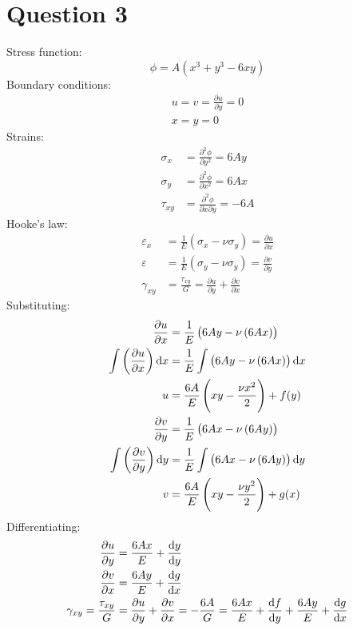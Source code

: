 \section{Question 3}
Stress function:
\begin{equation}
    \phi = A \left(x^3 + y^3 -6xy\right)
\end{equation}
Boundary conditions:
\begin{align}
    u = v = \frac{\partial u}{\partial y} = 0 \\
    x = y = 0
\end{align}
Strains:
\begin{align}
    \sigma_x  & = \frac{\partial^2 \phi}{\partial y^2} = 6Ay          \\
    \sigma_y  & = \frac{\partial^2 \phi}{\partial x^2} = 6Ax          \\
    \tau_{xy} & = \frac{\partial^2 \phi}{\partial x \partial y} = -6A
\end{align}
Hooke's law:
\begin{align}
    \varepsilon_x & = \frac{1}{E}\left(\sigma_x - \nu \sigma_y\right) = \frac{\partial u}{\partial x}     \\
    \varepsilon   & = \frac{1}{E}\left(\sigma_y - \nu \sigma_y\right) = \frac{\partial v}{\partial y}     \\
    \gamma_{xy}   & = \frac{\tau_{xy}}{G} = \frac{\partial u}{\partial y} + \frac{\partial v}{\partial x}
\end{align}
Substituting:
\begin{align}
    \frac{\partial u}{\partial x}                         & = \frac{1}{E}\left(6Ay - \nu \left(6Ax\right)\right)           \\
    \int\left(\frac{\partial u}{\partial x} \right)\dif x & = \frac{1}{E}\int\left(6Ay - \nu \left(6Ax\right)\right)\dif x \\
    u                                                     & = \frac{6A}{E}\left(xy - \frac{\nu x^2}{2}\right) + f(y)       \\
    \frac{\partial v}{\partial y}                         & = \frac{1}{E} \left(6Ax - \nu \left(6Ay\right)\right)          \\
    \int\left(\frac{\partial v}{\partial y}\right)\dif y  & = \frac{1}{E}\int\left(6Ax - \nu\left(6Ay\right)\right)\dif y  \\
    v                                                     & = \frac{6A}{E}\left(xy - \frac{\nu y^2}{2}\right) + g(x)
\end{align}
Differentiating:
\begin{align}
    \frac{\partial u }{\partial y}    & = \frac{6Ax}{E} + \frac{\dif y }{\dif y}                                                                                                                      \\
    \frac{\partial v}{\partial x}     & = \frac{6Ay}{E} + \frac{\dif g}{\dif x}                                                                                                                       \\
    \gamma_{xy} = \frac{\tau_{xy}}{G} & = \frac{\partial u}{\partial y} + \frac{\partial v}{\partial x} = -\frac{6A}{G}= \frac{6Ax}{E} + \frac{\dif f}{\dif y} + \frac{6Ay}{E}+ \frac{\dif g}{\dif x}
\end{align}
